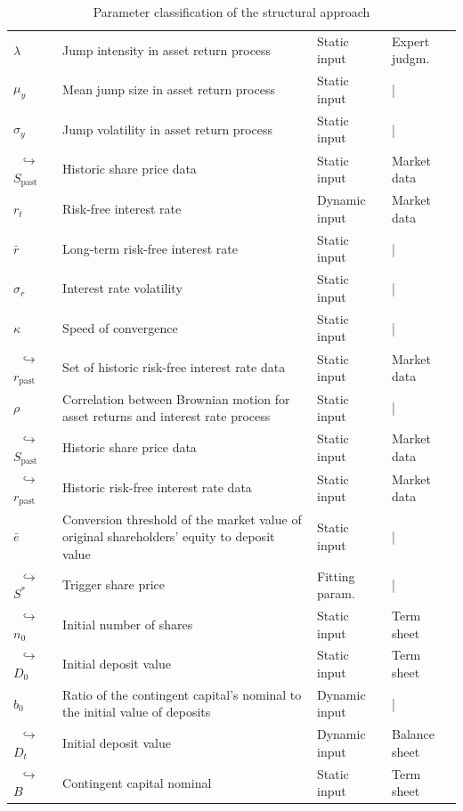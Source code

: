 \begin{table}
\begin{tabular}{p{1.8cm}p{6.8cm}p{2.4cm}p{2.5cm}}
   $\lambda$ & Jump intensity in asset return process & Static input  & Expert judgm.  \\ 
   $\mu_y$ & Mean jump size in asset return process & Static input & | \\
   $\sigma_y$ & Jump volatility in asset return process & Static input & | \\
   $\,\,\,$$\hookrightarrow$ $S_\text{past}$ &  Historic share price data & Static input & Market data\\
   $r_t$ & Risk-free interest rate & Dynamic input & Market data \\
   $\bar{r}$ & Long-term risk-free interest rate & Static input & | \\
   $\sigma_r$ &Interest rate volatility & Static input & | \\
   $\kappa$ & Speed of convergence & Static input & | \\
   $\,\,\,$$\hookrightarrow$ $r_\text{past}$ & Set of historic risk-free interest rate data & Static input & Market data\\
   $\rho$ & Correlation between Brownian motion for asset returns and interest rate process  & Static input & | \\ 
   $\,\,\,$$\hookrightarrow$ $S_\text{past}$ &  Historic share price data & Static input & Market data\\
   $\,\,\,$$\hookrightarrow$ $r_\text{past}$ &  Historic risk-free interest rate data & Static input & Market data\\
   $\bar{e}$ & Conversion threshold of the market value of original shareholders' equity to deposit value & Static input & | \\
   $\,\,\,$$\hookrightarrow$ $S^*$ & Trigger share price & Fitting param. & | \\
   $\,\,\,$$\hookrightarrow$ $n_0$ & Initial number of shares & Static input & Term sheet\\
   $\,\,\,$$\hookrightarrow$ $D_0$ & Initial deposit value & Static input & Term sheet\\
   $b_0$ & Ratio of the contingent capital's nominal to the initial value of deposits & Dynamic input & | \\
   $\,\,\,$$\hookrightarrow$ $D_t$ & Initial deposit value & Dynamic input & Balance sheet \\
   $\,\,\,$$\hookrightarrow$ $B$ & Contingent capital nominal & Static input & Term sheet\\
  \bottomrule
 \end{tabular}
 \caption[Parameter classification of the structural approach]{Parameter classification of the structural approach}
 \label{tbl:structuralapproachdata}
\end{table}

